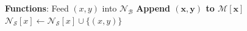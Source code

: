 \documentclass[10]{report}
\newcommand{\push}[1]{\text{push} \left ( #1 \right )}
\newcommand{\pop}{\text{pop}()}
\newcommand{\algoname}[1]{\textnormal{\textsc{#1}}}
\begin{document}
\begin{algorithm}[htbp]
\begin{flushleft}
\end{flushleft}
\begin{flushleft}
\begin{algorithmic}[1]
	\Statex \textbf{Functions}:
				\State Feed $(x,y)$ into $\mathcal{N}_\mathcal{B}$
				\State \textbf{Append $\boldsymbol{(x,y)}$ to $\boldsymbol{\mathcal{M}[x]}$}
			\Else
				\State $\mathcal{N}_\mathcal{S}[x] \gets \mathcal{N}_\mathcal{S}[x] \cup \{(x, y)\}$
			\EndIf
		\EndFunction

\end{algorithmic}
\end{flushleft}
\end{algorithm}
\end{document}

